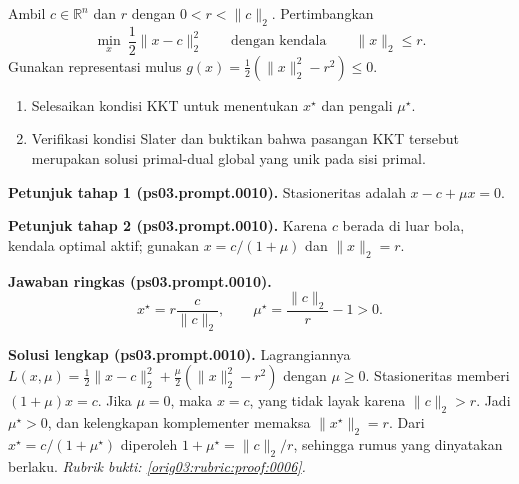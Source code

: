 \begin{exercise}
\label{orig03:ps03:problem:0005}
Ambil $c\in\mathbb{R}^n$ dan $r$ dengan $0<r<\lVert c\rVert_2$.
Pertimbangkan
\[
 \min_x\ \frac12\lVert x-c\rVert_2^2
 \qquad\text{dengan kendala}\qquad \lVert x\rVert_2\leq r.
\]
Gunakan representasi mulus
$g(x)=\tfrac12(\lVert x\rVert_2^2-r^2)\leq0$.
\begin{enumerate}
\item\label{orig03:ps03:prompt:0010}
Selesaikan kondisi KKT untuk menentukan $x^\star$ dan pengali
$\mu^\star$.
\item\label{orig03:ps03:prompt:0011}
Verifikasi kondisi Slater dan buktikan bahwa pasangan KKT tersebut merupakan
solusi primal-dual global yang unik pada sisi primal.
\end{enumerate}
\end{exercise}

\par\noindent\textbf{Petunjuk tahap 1 (ps03.prompt.0010).}
Stasioneritas adalah $x-c+\mu x=0$.
\label{orig03:ps03:hint1:0010}
\par\noindent\textbf{Petunjuk tahap 2 (ps03.prompt.0010).}
Karena $c$ berada di luar bola, kendala optimal aktif; gunakan
$x=c/(1+\mu)$ dan $\lVert x\rVert_2=r$.
\label{orig03:ps03:hint2:0010}
\par\noindent\textbf{Jawaban ringkas (ps03.prompt.0010).}
\[
 x^\star=r\frac{c}{\lVert c\rVert_2},
 \qquad
 \mu^\star=\frac{\lVert c\rVert_2}{r}-1>0.
\]
\label{orig03:ps03:answer:0010}
\par\noindent\textbf{Solusi lengkap (ps03.prompt.0010).}
Lagrangiannya
$L(x,\mu)=\tfrac12\lVert x-c\rVert_2^2+
\tfrac\mu2(\lVert x\rVert_2^2-r^2)$ dengan $\mu\geq0$.
Stasioneritas memberi $(1+\mu)x=c$. Jika $\mu=0$, maka $x=c$, yang tidak
layak karena $\lVert c\rVert_2>r$. Jadi $\mu^\star>0$, dan kelengkapan
komplementer memaksa $\lVert x^\star\rVert_2=r$. Dari
$x^\star=c/(1+\mu^\star)$ diperoleh
$1+\mu^\star=\lVert c\rVert_2/r$, sehingga rumus yang dinyatakan berlaku.
\emph{Rubrik bukti: \ref{orig03:rubric:proof:0006}.}
\label{orig03:ps03:solution:0010}

